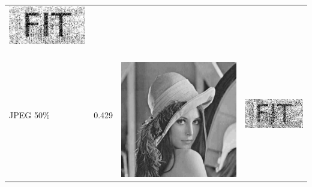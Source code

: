 \begin{table}[h]
\begin{tabular}{llcc}
 \begin{minipage}[c]{.15\textwidth}
   \includegraphics[scale=0.25]{obrazky/jpeg70-wm}
 \end{minipage}  \\
JPEG 50\%                       & 0.429 &
\begin{minipage}[c]{.1\textwidth}
\ 
  \includegraphics[scale=0.1]{obrazky/jpeg50}
\end{minipage} &
 \begin{minipage}[c]{.15\textwidth}
   \includegraphics[scale=0.25]{obrazky/jpeg50-wm}

\end{minipage}
\end{tabular}
\end{table}
